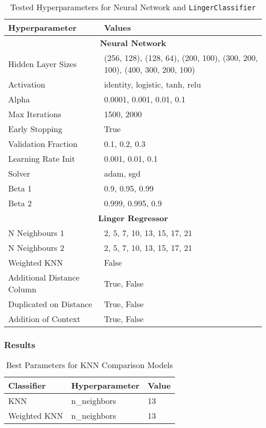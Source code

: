\documentclass[a4paper, 12pt]{report}
\begin{document}
\begin{table}[H]
    \centering
    \caption{Tested Hyperparameters for Neural Network and \texttt{LingerClassifier}}
    \label{tab:hyperparameters_raisin}
    \small
    \begin{tabular}{|l|l|}
    \hline
    \textbf{Hyperparameter} & \textbf{Values} \\ \hline
    \multicolumn{2}{|c|}{\textbf{Neural Network}} \\ \hline
    Hidden Layer Sizes & (256, 128), (128, 64), (200, 100), (300, 200, 100), (400, 300, 200, 100) \\ \hline
    Activation & identity, logistic, tanh, relu \\ \hline
    Alpha & 0.0001, 0.001, 0.01, 0.1 \\ \hline
    Max Iterations & 1500, 2000 \\ \hline
    Early Stopping & True \\ \hline
    Validation Fraction & 0.1, 0.2, 0.3 \\ \hline
    Learning Rate Init & 0.001, 0.01, 0.1 \\ \hline
    Solver & adam, sgd \\ \hline
    Beta 1 & 0.9, 0.95, 0.99 \\ \hline
    Beta 2 & 0.999, 0.995, 0.9 \\ \hline
    \multicolumn{2}{|c|}{\textbf{Linger Regressor}} \\ \hline
    N Neighbours 1 & 2, 5, 7, 10, 13, 15, 17, 21 \\ \hline
    N Neighbours 2 & 2, 5, 7, 10, 13, 15, 17, 21 \\ \hline
    Weighted KNN & False \\ \hline
    Additional Distance Column & True, False \\ \hline
    Duplicated on Distance & True, False \\ \hline
    Addition of Context & True, False \\ \hline
    \end{tabular}
\end{table}
\clearpage

\subsubsection{Results}

\begin{table}[H]
    \centering
    \caption{Best Parameters for KNN Comparison Models}
    \label{tab:best_parameters_combined_knn_exp3}
    \begin{tabular}{|l|l|l|}
    \toprule
    \textbf{Classifier} & \textbf{Hyperparameter} & \textbf{Value} \\
    \midrule
    KNN & n\_neighbors & 13 \\
    Weighted KNN & n\_neighbors & 13 \\
    \bottomrule
\end{tabular}
\end{table}
\end{document}
